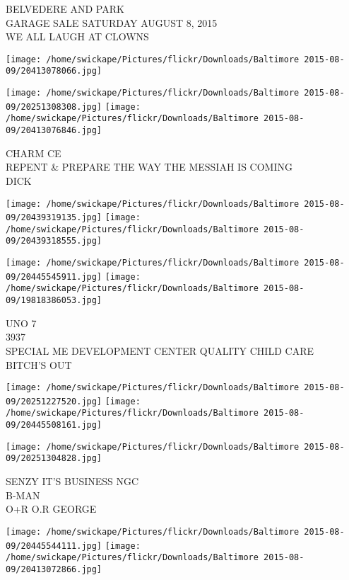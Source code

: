 \documentclass[10pt,letterpaper]{article}
\begin{document}
BELVEDERE AND PARK\\
GARAGE SALE SATURDAY AUGUST 8, 2015\\
WE ALL LAUGH AT CLOWNS\\
\pagebreak

\texttt{[image: /home/swickape/Pictures/flickr/Downloads/Baltimore 2015-08-09/20413078066.jpg]}

\vspace{0.25in}
\texttt{[image: /home/swickape/Pictures/flickr/Downloads/Baltimore 2015-08-09/20251308308.jpg]}
\texttt{[image: /home/swickape/Pictures/flickr/Downloads/Baltimore 2015-08-09/20413076846.jpg]}

CHARM CE\\
REPENT \& PREPARE THE WAY THE MESSIAH IS COMING\\
DICK\\
\pagebreak

\texttt{[image: /home/swickape/Pictures/flickr/Downloads/Baltimore 2015-08-09/20439319135.jpg]}
\texttt{[image: /home/swickape/Pictures/flickr/Downloads/Baltimore 2015-08-09/20439318555.jpg]}

\texttt{[image: /home/swickape/Pictures/flickr/Downloads/Baltimore 2015-08-09/20445545911.jpg]}
\texttt{[image: /home/swickape/Pictures/flickr/Downloads/Baltimore 2015-08-09/19818386053.jpg]}

UNO 7\\
3937\\
SPECIAL ME DEVELOPMENT CENTER QUALITY CHILD CARE\\
BITCH'S OUT\\
\pagebreak

\texttt{[image: /home/swickape/Pictures/flickr/Downloads/Baltimore 2015-08-09/20251227520.jpg]}
\texttt{[image: /home/swickape/Pictures/flickr/Downloads/Baltimore 2015-08-09/20445508161.jpg]}

\vspace{0.25in}
\texttt{[image: /home/swickape/Pictures/flickr/Downloads/Baltimore 2015-08-09/20251304828.jpg]}

SENZY IT'S BUSINESS NGC\\
B{-}MAN\\
O+R O.R GEORGE\\
\pagebreak

\texttt{[image: /home/swickape/Pictures/flickr/Downloads/Baltimore 2015-08-09/20445544111.jpg]}
\texttt{[image: /home/swickape/Pictures/flickr/Downloads/Baltimore 2015-08-09/20413072866.jpg]}
\end{document}
